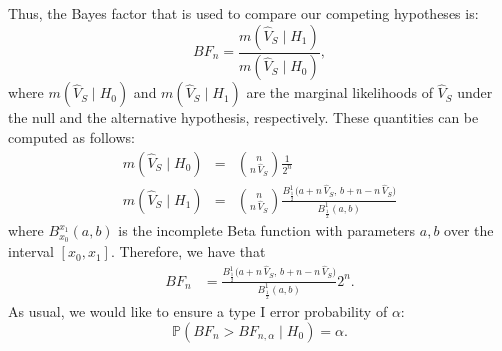 \documentclass[12pt]{article}
\begin{document}
Thus, the Bayes factor that is used to compare our competing hypotheses is:
\begin{equation}
    BF_{n} = \frac{m \left( \widehat{V}_{S} \mid H_{1} \right) }{m \left( \widehat{V}_{S} \mid H_{0} \right)},
\end{equation}
where \(m \left( \widehat{V}_{S} \mid H_{0} \right) \) and \(m \left( \widehat{V}_{S} \mid H_{1} \right) \) are the marginal likelihoods of \(\widehat{V}_{S}\) under the null and the alternative hypothesis, respectively. These quantities can be computed as follows:
\begin{eqnarray}
m \left(\widehat{V}_{S} \mid H_{0} \right) 
&=& \binom{n}{n \, \widehat{V}_{S}} \frac{1}{2^{n}} \\
m\left(\widehat{V}_{S} \mid H_1\right) 
&=& %
\binom{n}{n \, \widehat{V}_{S}} \frac{B_{\frac{1}{2}}^{1}\big(a + n \, \widehat{V}_{S}, \, b + n - n \, \widehat{V}_{S}\big)}{B_{\frac{1}{2}}^{1}(a, b)}
\end{eqnarray}
where \(B_{x_{0}}^{x_{1}}(a, b)\) is the incomplete Beta function with parameters \(a, b\) over the interval \([x_{0}, x_{1}]\). Therefore, we have that
\vspace{-2mm} %
\begin{equation}
    \begin{aligned}
      BF_{n} %
        & = \frac{B_{\frac{1}{2}}^{1}\big(a + n \, \widehat{V}_{S}, \, b + n - n \, \widehat{V}_{S}\big)}{B_{\frac{1}{2}}^{1}(a, b)} 2^n.
    \end{aligned}
\end{equation}
As usual, we would like to ensure a type I error probability of $\alpha$:
\begin{equation}
    \mathbb{P} (BF_{n} > BF_{n, \alpha} \mid H_0) = \alpha.
\end{equation}
\end{document}
